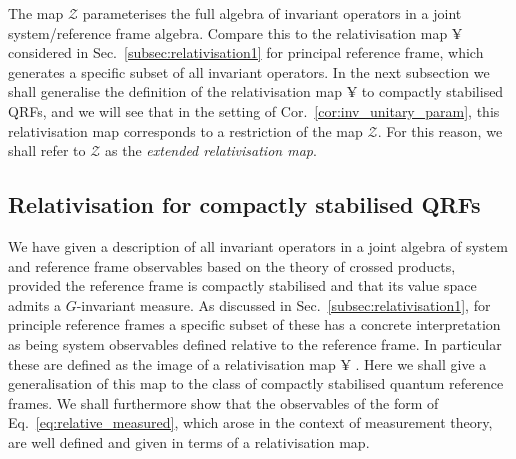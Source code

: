 \documentclass[sn-mathphys-num]{sn-jnl}%
\newcommand{\zen}{%
    \mathscr{Z}
}
\numberwithin{equation}{section}
\theoremstyle{thmstyleone}%
\theoremstyle{thmstyletwo}%
\theoremstyle{thmstylethree}%
\begin{document}
    The map $\zen$ parameterises the full algebra of invariant operators in a joint system/ref{\-}erence frame algebra. Compare this to the relativisation map $\yen$ considered in Sec.\ \ref{subsec:relativisation1} for principal reference frame, which generates a specific subset of all invariant operators. In the next subsection we shall generalise the definition of the relativisation map $\yen$ to compactly stabilised QRFs, and we will see that in the setting of Cor.\ \ref{cor:inv_unitary_param}, this relativisation map corresponds to a restriction of the map $\zen$. For this reason, we shall refer to $\zen$ as the \textit{extended relativisation map}.
    
    \subsection{Relativisation for compactly stabilised QRFs}\label{subsec:relativisation} 
    We have given a description of all invariant operators in a joint algebra of system and reference frame observables based on the theory of crossed products, provided the reference frame is compactly stabilised and that its value space admits a $G$-invariant measure. As discussed in Sec.\  \ref{subsec:relativisation1}, for principle reference frames a specific subset of these has a concrete interpretation as being system observables defined relative to the reference frame. In particular these are defined as the image of a relativisation map $\yen$ \cite{loveridge2017relativity}. Here we shall give a generalisation of this map to the class of compactly stabilised quantum reference frames. We shall furthermore show that the observables of the form of Eq.\ \eqref{eq:relative_measured}, which arose in the context of measurement theory, are well defined and given in terms of a relativisation map.
    
\end{document}
